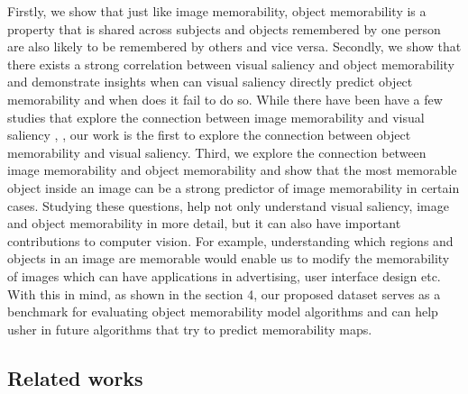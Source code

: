 Firstly, we show that just like image memorability, object memorability is a property that is shared across subjects and objects remembered by one person are also likely to be remembered by others and vice versa. Secondly, we show that there exists a strong correlation between visual saliency and object memorability and demonstrate insights when can visual saliency directly predict object memorability and when does it fail to do so. While there have been have a few studies that explore the connection between image memorability and visual saliency \cite{zoya15}, \cite{lemeur13}, our work is the first to explore the connection between object memorability and visual saliency. Third, we explore the connection between image memorability and object memorability and show that the most memorable object inside an image can be a strong predictor of image memorability in certain cases. Studying these questions, help not only understand visual saliency, image and object memorability in more detail, but it can also have important contributions to computer vision. For example, understanding which regions and objects in an image are memorable would enable us to modify the memorability of images which can have applications in advertising, user interface design etc. With this in mind, as shown in the section 4, our proposed dataset serves as a benchmark for evaluating object memorability model algorithms and can help usher in future algorithms that try to predict memorability maps.


\subsection{Related works}
